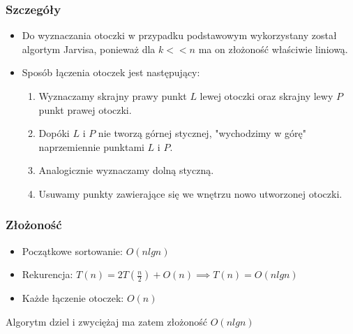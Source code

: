 \documentclass[11pt]{article}
\theoremstyle{remark} \newtheorem{definition}{def.}
\theoremstyle{definition} \newtheorem{twierdzenie}{tw.}
\begin{document}
    \subsubsection{Szczegóły}

    \begin{itemize}
        \item   Do wyznaczania otoczki w przypadku podstawowym wykorzystany został algortym Jarvisa, ponieważ dla $k << n$ ma on złożoność właściwie liniową.
        \item   Sposób łączenia otoczek jest następujący: 
                \begin{enumerate}
                    \item  Wyznaczamy skrajny prawy punkt $L$ lewej otoczki oraz skrajny lewy $P$ punkt prawej otoczki. 
                    \item  Dopóki $L$ i $P$ nie tworzą górnej stycznej, "wychodzimy w górę" naprzemiennie punktami $L$ i $P$.
                    \item  Analogicznie wyznaczamy dolną styczną. 
                    \item  Usuwamy punkty zawierające się we wnętrzu nowo utworzonej otoczki.  
                \end{enumerate}
    \end{itemize}

    \subsubsection{Złożoność}

    \begin{itemize}
        \item Początkowe sortowanie: $O(n lg n)$
        \item Rekurencja: $T(n) = 2 T(\frac{n}{2}) + O(n) \implies T(n) = O(n lg n)$
        \item Każde łączenie otoczek: $O(n)$
    \end{itemize}

    Algorytm dziel i zwyciężaj ma zatem złożoność $O(n lg n)$
\end{document}
